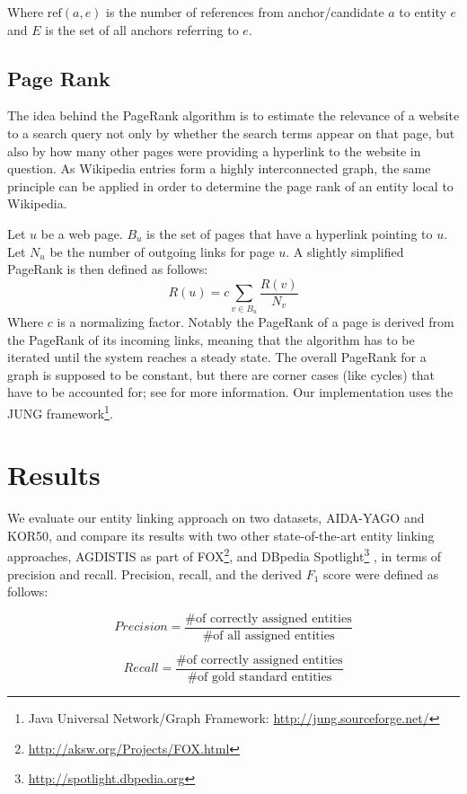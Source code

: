 \documentclass[runningheads,a4paper]{llncs}
\begin{document}
{Where $\mathrm{ref}(a, e)$ is the number of references from anchor/candidate $a$ to entity $e$ and $E$ is the set of all anchors referring to $e$.

\subsection{Page Rank}

The idea behind the PageRank \cite{pageRank} algorithm is to estimate the relevance of a website to a search query not only by whether the search terms appear on that page, but also by how many other pages were providing a hyperlink to the website in question. As Wikipedia entries form a highly interconnected graph, the same principle can be applied in order to determine the page rank of an entity local to Wikipedia.

Let $u$ be a web page. $B_u$ is the set of pages that have a hyperlink pointing to $u$. Let $N_u$ be the number of outgoing links for page $u$. A slightly simplified PageRank is then defined as follows: 
$$R(u) = c \sum_{v \in B_u} \frac{R(v)}{N_v}$$
Where $c$ is a normalizing factor. Notably the PageRank of a page is derived from the PageRank of its incoming links, meaning that the algorithm has to be iterated until the system reaches a steady state. The overall PageRank for a graph is supposed to be constant, but there are corner cases (like cycles) that have to be accounted for; see \cite{pageRank} for more information. Our implementation uses the JUNG framework\footnote{Java Universal Network/Graph Framework: \url{http://jung.sourceforge.net/}}.

\section{Results}\label{sec:results}

We evaluate our entity linking approach on two datasets, AIDA-YAGO and KOR50, and compare its results with two other state-of-the-art entity linking approaches, AGDISTIS \cite{agdistis} as part of FOX\footnote{\url{http://aksw.org/Projects/FOX.html}}, and DBpedia Spotlight\footnote{\url{http://spotlight.dbpedia.org}} \cite{spotlight},  
in terms of precision and recall. Precision, recall, and the derived $F_1$ score were defined as follows:

$$ Precision = \frac{\text{\# of correctly assigned entities}}{\text{\# of all assigned entities}} $$

$$ Recall = \frac{\text{\# of correctly assigned entities}}{\text{\# of gold standard entities}} $$

}
\end{document}

